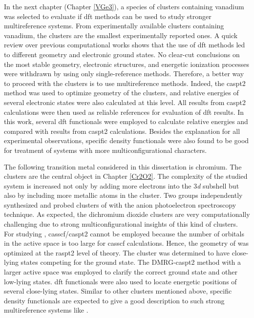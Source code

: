 \begin{refsection}
In the next chapter (Chapter \ref{VGe3}), a species of clusters containing vanadium was selected to evaluate if \acrshort{dft} methods can be used to study stronger multireference systems. From experimentally available clusters containing vanadium, the  clusters are the smallest experimentally reported ones. A quick review over previous computational works shows that the use of \acrshort{dft} methods led to different geometry and electronic ground states. No clear-cut conclusions on the most stable geometry, electronic structures, and energetic ionization processes were withdrawn by using only single-reference methods. Therefore, a better way to proceed with the  clusters is to use multireference methods. Indeed, the \acrshort{caspt2} method was used to optimize geometry of the clusters, and relative energies of several electronic states were also calculated at this level. All results from \acrshort{caspt2} calculations were then used as reliable references for evaluation of \acrshort{dft} results. In this work, several \acrshort{dft} functionals were employed to calculate relative energies and compared with results from \acrshort{caspt2} calculations. Besides the explanation for all experimental observations, specific density functionals were also found to be good for treatment of systems with more multiconfigurational characters.     




The following transition metal considered in this dissertation is chromium. The  clusters are the central object in Chapter \ref{Cr2O2}. The complexity of the studied system is increased not only by adding more electrons into the 3\textit{d} subshell but also by including more metallic atoms in the cluster. Two groups independently synthesized and probed clusters of  with the anion photoelectron spectroscopy technique. \cite{c1:16, c1:17} As expected, the dichromium dioxide clusters  are very computationally challenging due to strong multiconfigurational insights of this kind of clusters. For studying , \acrshort{casscf}/\acrshort{caspt2} cannot be employed because the number of orbitals in the active space is too large for \acrshort{casscf} calculations. Hence, the geometry of  was optimized at the \acrshort{raspt2} level of theory. The  cluster was determined to have close-lying states competing for the ground state. The DMRG-\acrshort{caspt2} method with a larger active space was employed to clarify the correct ground state and other low-lying states. \acrshort{dft} functionals were also used to locate energetic positions of several close-lying states. Similar to other clusters mentioned above, specific density functionals are expected to give a good description to such strong multireference systems like . 




\end{refsection}
